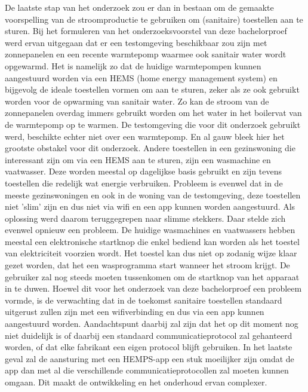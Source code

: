 De laatste stap van het onderzoek zou er dan in bestaan om de gemaakte voorspelling van de stroomproductie te gebruiken om (sanitaire) toestellen aan te sturen. Bij het formuleren van het onderzoeksvoorstel van deze bachelorproef werd ervan uitgegaan dat er een testomgeving beschikbaar zou zijn met zonnepanelen en een recente warmtepomp waarmee ook sanitair water wordt opgewarmd. Het is namelijk zo dat de huidige warmtepompen kunnen aangestuurd worden via een HEMS (home energy management system) en bijgevolg de ideale toestellen vormen om aan te sturen, zeker als ze ook gebruikt worden voor de opwarming van sanitair water. Zo kan de stroom van de zonnepanelen overdag immers gebruikt worden om het water in het boilervat van de warmtepomp op te warmen. De testomgeving die voor dit onderzoek gebruikt werd, beschikte echter niet over een warmtepomp. En al gauw bleek hier het grootste obstakel voor dit onderzoek. Andere toestellen in een gezinswoning die interessant zijn om via een HEMS aan te sturen, zijn een wasmachine en vaatwasser. Deze worden meestal op dagelijkse basis gebruikt en zijn tevens toestellen die redelijk wat energie verbruiken. Probleem is evenwel dat in de meeste gezinswoningen en ook in de woning van de testomgeving, deze toestellen niet 'slim' zijn en dus niet via wifi en een app kunnen worden aangestuurd. Als oplossing werd daarom teruggegrepen naar slimme stekkers. Daar stelde zich evenwel opnieuw een probleem. De huidige wasmachines en vaatwassers hebben meestal een elektronische startknop die enkel bediend kan worden als het toestel van elektriciteit voorzien wordt. Het toestel kan dus niet op zodanig wijze klaar gezet worden, dat het een wasprogramma start wanneer het stroom krijgt. De gebruiker zal nog steeds moeten tussenkomen om de startknop van het apparaat in te duwen. Hoewel dit voor het onderzoek van deze bachelorproef een probleem vormde, is de verwachting dat in de toekomst sanitaire toestellen standaard uitgerust zullen zijn met een wifiverbinding en dus via een app kunnen aangestuurd worden. Aandachtspunt daarbij zal zijn dat het op dit moment nog niet duidelijk is of daarbij een standaard communicatieprotocol zal gehanteerd worden, of dat elke fabrikant een eigen protocol blijft gebruiken. In het laatste geval zal de aansturing met een HEMPS-app een stuk moeilijker zijn omdat de app dan met al die verschillende communicatieprotocollen zal moeten kunnen omgaan. Dit maakt de ontwikkeling en het onderhoud ervan complexer. \\

